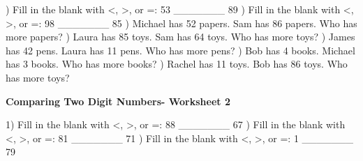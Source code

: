 \documentclass{article}%
\begin{document}
\newline%
\newline%
) Fill in the blank with <, >, or =: 53 \_\_\_\_\_\_\_ 89%
\newline%
\newline%
) Fill in the blank with <, >, or =: 98 \_\_\_\_\_\_\_ 85%
\newline%
\newline%
) Michael has 52 papers. Sam has 86 papers. Who has more papers?%
\newline%
\newline%
) Laura has 85 toys. Sam has 64 toys. Who has more toys?%
\newline%
\newline%
) James has 42 pens. Laura has 11 pens. Who has more pens?%
\newline%
\newline%
) Bob has 4 books. Michael has 3 books. Who has more books?%
\newline%
\newline%
) Rachel has 11 toys. Bob has 86 toys. Who has more toys?%
\newline%
\newline%
\newline%
\pagebreak%
\large%
\begin{center}%
\textbf{Comparing Two Digit Numbers- Worksheet 2}%
\newline%
\newline%
\newline%
\end{center} \normalsize%
1) Fill in the blank with <, >, or =: 88 \_\_\_\_\_\_\_ 67%
\newline%
\newline%
) Fill in the blank with <, >, or =: 81 \_\_\_\_\_\_\_ 71%
\newline%
\newline%
) Fill in the blank with <, >, or =: 1 \_\_\_\_\_\_\_ 79%
\newline%
\newline%
\newline%
\end{document}
